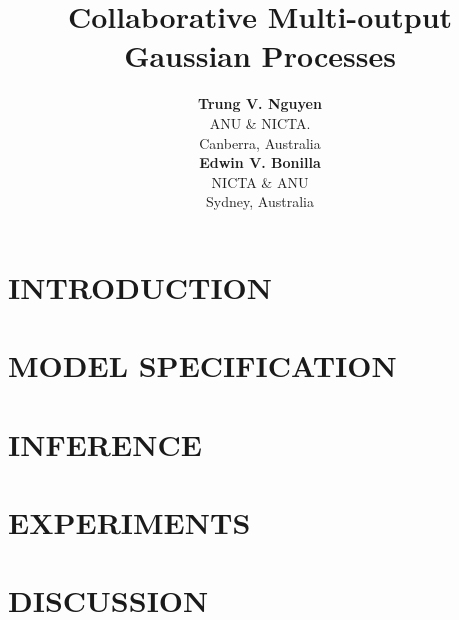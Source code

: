 \documentclass[]{article}
\title{Collaborative Multi-output Gaussian Processes}
\author{} %
\author{ {\bf Trung V. Nguyen} \\
ANU \& NICTA. \\
Canberra, Australia\\
\And
{\bf Edwin V. Bonilla}  \\
NICTA \& ANU          \\
Sydney, Australia \\
}
\begin{document}
\maketitle

\begin{abstract}

\end{abstract}

\section{INTRODUCTION}


\section{MODEL SPECIFICATION \label{sec:model}}


\section{INFERENCE \label{sec:inference}}


\section{EXPERIMENTS \label{sec:experiments}}


\section{DISCUSSION \label{sec:discussion}}





\end{document}
